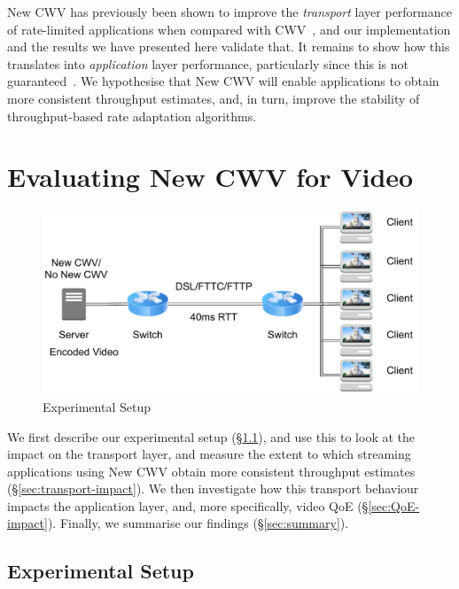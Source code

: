 \documentclass[10pt,sigconf,anonymous]{acmart}
\begin{document}
New CWV has previously been shown to improve the \emph{transport} layer performance of rate-limited applications when compared with CWV~\cite{Nazir-2014-performance-evaluation-congestion-window-validation-dash-newcwv}, and our implementation and the results we have presented here validate that. It remains to show how this translates into \emph{application} layer performance, particularly since this is not guaranteed~\cite{Spiteri-2016-BOLA}. We hypothesise that New CWV will enable applications to obtain more consistent throughput estimates, and, in turn, improve the stability of throughput-based rate adaptation algorithms.

\section{Evaluating New CWV for Video}
\label{sec:evaluation}

\begin{figure}
  \centering
  \includegraphics[width=.5\textwidth]{figures/setup.pdf}
  \caption{Experimental Setup}
  \label{fig:experimental-setup}
\end{figure}

We first describe our experimental setup (\S\ref{sec:experimental-setup}), and use this to look at the impact on the transport layer, and measure the extent to which streaming applications using New CWV obtain more consistent throughput estimates (\S\ref{sec:transport-impact}). We then investigate how this transport behaviour impacts the application layer, and, more specifically, video QoE (\S\ref{sec:QoE-impact}). Finally,  we summarise our findings (\S\ref{sec:summary}).

\subsection{Experimental Setup}
\label{sec:experimental-setup}
\end{document}
